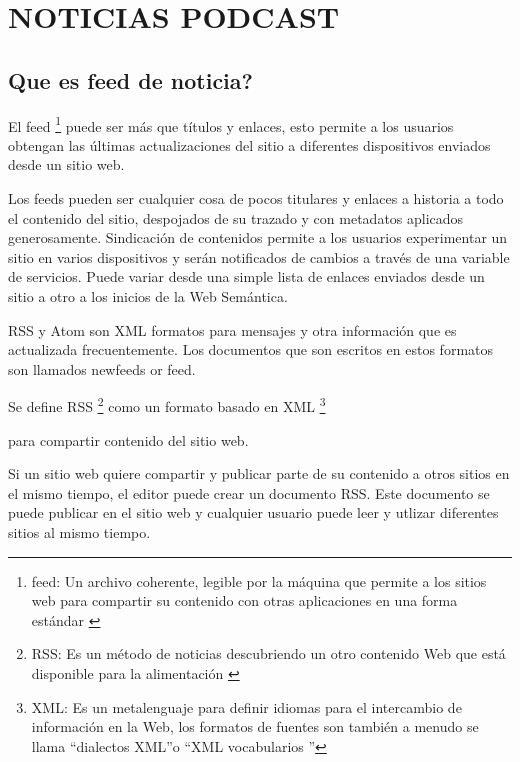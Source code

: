 \chapter{NOTICIAS PODCAST}

\section{\textquestiondown Que es feed de noticia?}

El feed \footnote{feed: Un archivo coherente, legible por la m\'{a}quina que 
permite a los sitios web para compartir su contenido con otras aplicaciones en
una forma est\'{a}ndar \cite{hammersley2005developing}} puede ser m\'{a}s que 
t\'{i}tulos y enlaces, esto permite a los usuarios obtengan las \'{u}ltimas 
actualizaciones del sitio a diferentes dispositivos enviados desde un sitio web.

Los feeds pueden ser cualquier cosa de pocos titulares y enlaces a historia a todo
el contenido del sitio, despojados de su trazado y con metadatos aplicados generosamente.
Sindicaci\'{o}n de contenidos permite a los usuarios experimentar un sitio en varios 
dispositivos y ser\'{a}n notificados de cambios a trav\'{e}s de una variable de servicios. 
Puede variar desde una simple lista de enlaces enviados desde un sitio a otro a los 
inicios de la Web Sem\'{a}ntica.\cite{hammersley2005developing}

RSS y Atom son XML formatos para mensajes y otra informaci\'{o}n que es actualizada 
frecuentemente. Los documentos que son escritos en estos formatos son llamados newfeeds
or feed.\cite{wittenbrink2005rss}

Se define RSS \footnote{RSS: Es un m\'{e}todo de noticias descubriendo un otro 
contenido Web que est\'{a} disponible para la alimentaci\'{o}n 
\cite{zeki2004rss}} como un formato basado en XML 
\footnote{XML: Es un metalenguaje para definir idiomas para el intercambio de 
informaci\'{o}n en la Web, los formatos de fuentes son tambi\'{e}n a menudo se
llama \textquotedblleft dialectos XML\textquotedblright o \textquotedblleft XML
vocabularios \textquotedblright \cite{wittenbrink2005rss}} 

para compartir contenido del sitio web.

Si un sitio web quiere compartir y publicar parte de su contenido a otros sitios en el
mismo tiempo, el editor puede crear un documento RSS. Este documento se puede publicar
en el sitio web y cualquier usuario puede leer y utlizar diferentes sitios al mismo 
tiempo. \cite{zeki2004rss}

